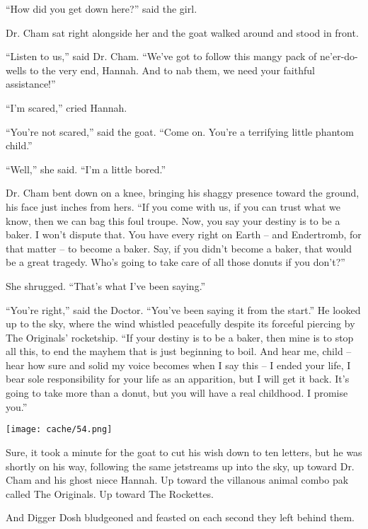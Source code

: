 \documentclass[12pt,twoside]{report}
\begin{document}
``How did you get down here?'' said the girl.

Dr. Cham sat right alongside her and the goat walked around and stood
in front.

``Listen to us,'' said Dr. Cham.  ``We've got to follow this mangy
pack of ne'er-do-wells to the very end, Hannah.  And to nab them, we
need your faithful assistance!''

``I'm scared,'' cried Hannah.

``You're not scared,'' said the goat.  ``Come on.  You're a terrifying
little phantom child.''

``Well,'' she said.  ``I'm a little bored.''

Dr. Cham bent down on a knee, bringing his shaggy presence toward the
ground, his face just inches from hers.  ``If you come with us, if you
can trust what we know, then we can bag this foul troupe.  Now, you
say your destiny is to be a baker.  I won't dispute that. You have
every right on Earth -- and Endertromb, for that matter -- to become a
baker. Say, if you didn't become a baker, that would be a great
tragedy.  Who's going to take care of all those donuts if you don't?''

She shrugged.  ``That's what I've been saying.''

``You're right,'' said the Doctor.  ``You've been saying it from the
start.''  He looked up to the sky, where the wind whistled peacefully
despite its forceful piercing by The Originals' rocketship.  ``If your
destiny is to be a baker, then mine is to stop all this, to end the
mayhem that is just beginning to boil.  And hear me, child -- hear how
sure and solid my voice becomes when I say this -- I ended your life,
I bear sole responsibility for your life as an apparition, but I will
get it back.  It's going to take more than a donut, but you will have
a real childhood.  I promise you.''

	\texttt{[image: cache/54.png]}

Sure, it took a minute for the goat to cut his wish down to ten
letters, but he was shortly on his way, following the same jetstreams
up into the sky, up toward Dr. Cham and his ghost niece Hannah.  Up
toward the villanous animal combo pak called The Originals.  Up toward
The Rockettes.

And Digger Dosh bludgeoned and feasted on each second they left behind
them.

\newpage
\thispagestyle{empty}
\mbox{}
\newpage
\thispagestyle{empty}
\mbox{}
\cleartooddpage
\end{document}
